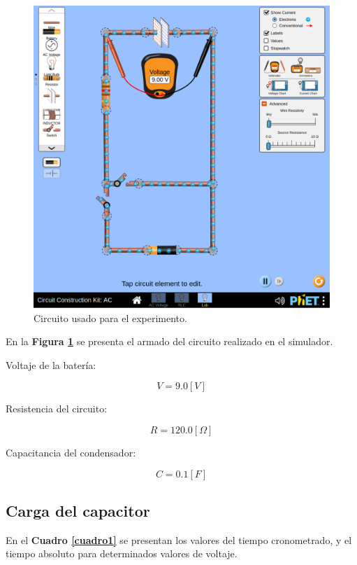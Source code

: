 \documentclass[letter,11pt]{article}
\begin{document}
\begin{figure}[!h]
\centering
\includegraphics[scale=0.40]{resources/figura3.eps}
\caption{Circuito usado para el experimento.}
\label{figura3}
\end{figure}

En la \textbf{Figura \ref{figura3}} se presenta el armado del circuito realizado
en el simulador.

Voltaje de la batería:

\begin{equation*}
    V = 9.0 [V]
\end{equation*}

Resistencia del circuito:

\begin{equation*}
    R = 120.0 [\Omega]
\end{equation*}

Capacitancia del condensador:

\begin{equation*}
    C = 0.1 [F]
\end{equation*}

\subsection{Carga del capacitor}
En el \textbf{Cuadro \ref{cuadro1}} se presentan los valores del tiempo
cronometrado, y el tiempo absoluto para determinados valores de voltaje.
\end{document}
